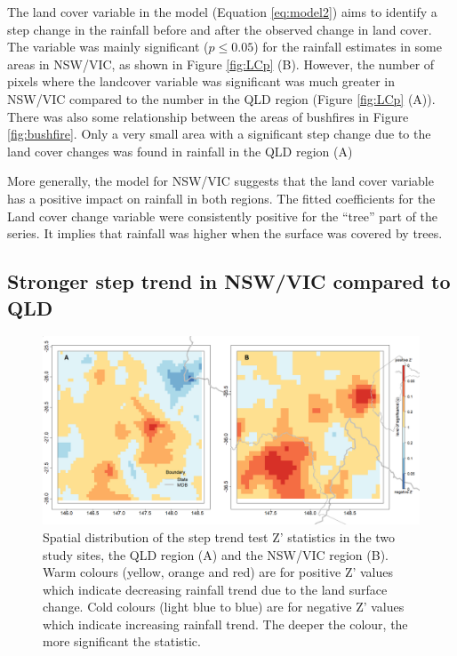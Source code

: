 \documentclass[fleqn,10pt,lineno]{wlpeerj} %
\theoremstyle{definition}
\theoremstyle{definition}
\theoremstyle{definition}
\theoremstyle{remark}
\begin{document}
The land cover variable in the model (Equation \eqref{eq:model2}) aims to
identify a step change in the rainfall before and after the observed
change in land cover. The variable was mainly significant
(\(p \leq 0.05\)) for the rainfall estimates in some areas in NSW/VIC,
as shown in Figure \ref{fig:LCp} (B). However, the number of pixels
where the landcover variable was significant was much greater in NSW/VIC
compared to the number in the QLD region (Figure \ref{fig:LCp} (A)).
There was also some relationship between the areas of bushfires in
Figure \ref{fig:bushfire}. Only a very small area with a significant
step change due to the land cover changes was found in rainfall in the
QLD region (A)

More generally, the model for NSW/VIC suggests that the land cover
variable has a positive impact on rainfall in both regions. The fitted
coefficients for the Land cover change variable were consistently
positive for the ``tree'' part of the series. It implies that rainfall
was higher when the surface was covered by trees.

\subsection{Stronger step trend in NSW/VIC compared to
QLD}\label{stronger-step-trend-in-nswvic-compared-to-qld}

\begin{figure}
\includegraphics[width=0.9\linewidth]{figures/Fig9} \caption{Spatial distribution of the step trend test Z' statistics in the two study sites, the QLD region (A) and the NSW/VIC region (B). Warm colours (yellow, orange and red) are for positive Z' values which indicate decreasing rainfall trend due to the land surface change. Cold colours (light blue to blue) are for negative Z' values which indicate increasing rainfall trend. The deeper the colour, the more significant the statistic.}\label{fig:steptest30}
\end{figure}
\end{document}
